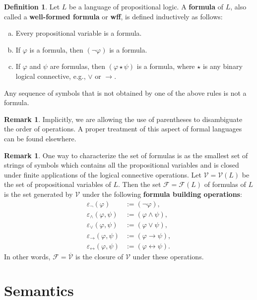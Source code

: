 \documentclass[12pt]{article}
\theoremstyle{definition}
\newtheorem{definition}[theorem]{Definition}
\newtheorem{remark}[theorem]{Remark}
\newcommand{\eps}{\varepsilon}
\renewcommand{\phi}{\varphi}
\newcommand{\<}{\langle}
\renewcommand{\>}{\rangle}
\newcommand{\clo}{\overline}
\newcommand{\FF}{\mathcal{F}}
\newcommand{\VV}{\mathcal{V}}
\newcommand{\keyword}{\textbf}
\newcommand{\liff}{\leftrightarrow}
\begin{document}
\begin{definition}
    Let $L$ be a language of propositional logic.
    A \keyword{formula} of $L$, also called a \keyword{well-formed formula} or \keyword{wff}, is defined inductively as follows:
    \begin{enumerate}[(a)]
        \item Every propositional variable is a formula.
        \item If $\phi$ is a formula, then $(\lnot\phi)$ is a formula.
        \item If $\phi$ and $\psi$ are formulas, then $(\phi \star \psi)$ is a formula, where $\star$ is any binary logical connective, e.g., $\lor$ or $\to$.
    \end{enumerate}
    Any sequence of symbols that is not obtained by one of the above rules is not a formula.
\end{definition}

\begin{remark}
    Implicitly, we are allowing the use of parentheses to disambiguate the order of operations.
    A proper treatment of this aspect of formal languages can be found elsewhere.
\end{remark}

\begin{remark}
    One way to characterize the set of formulas is as the smallest set of strings of symbols which contains all the propositional variables and is closed under finite applications of the logical connective operations.
    Let $\VV = \VV(L)$ be the set of propositional variables of $L$.
    Then the set $\FF = \FF(L)$ of formulas of $L$ is the set generated by $\VV$ under the following \keyword{formula building operations}:
    \begin{align*}
        \eps_\lnot(\phi) &:= (\lnot \phi), \\
        \eps_\land(\phi, \psi) &:= (\phi \land \psi), \\
        \eps_\lor(\phi, \psi) &:= (\phi \lor \psi), \\
        \eps_\to(\phi, \psi) &:= (\phi \to \psi), \\
        \eps_\liff(\phi, \psi) &:= (\phi \liff \psi).
    \end{align*}
    In other words, $\FF = \clo{\VV}$ is the closure of $\VV$ under these operations. 
\end{remark}

\section{Semantics}
\end{document}
